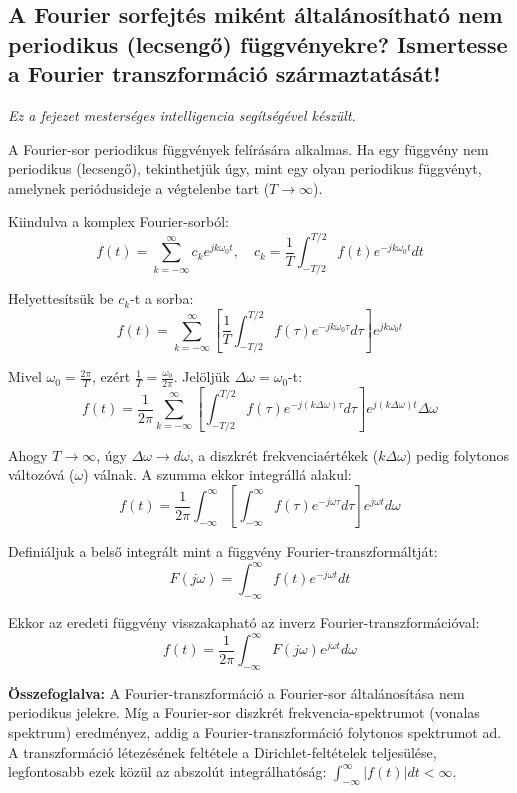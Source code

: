 \subsection{A Fourier sorfejtés miként általánosítható nem periodikus (lecsengő) függvényekre? Ismertesse a Fourier transzformáció származtatását!}

\noindent \textit{Ez a fejezet mesterséges intelligencia segítségével készült.}

A Fourier-sor periodikus függvények felírására alkalmas. Ha egy függvény nem periodikus (lecsengő), tekinthetjük úgy, mint egy olyan periodikus függvényt, amelynek periódusideje a végtelenbe tart ($T \to \infty$).

Kiindulva a komplex Fourier-sorból:
$$ f(t) = \sum_{k=-\infty}^{\infty} c_k e^{jk\omega_0 t}, \quad c_k = \frac{1}{T} \int_{-T/2}^{T/2} f(t) e^{-jk\omega_0 t} dt $$

Helyettesítsük be $c_k$-t a sorba:
$$ f(t) = \sum_{k=-\infty}^{\infty} \left[ \frac{1}{T} \int_{-T/2}^{T/2} f(\tau) e^{-jk\omega_0 \tau} d\tau \right] e^{jk\omega_0 t} $$

Mivel $\omega_0 = \frac{2\pi}{T}$, ezért $\frac{1}{T} = \frac{\omega_0}{2\pi}$. Jelöljük $\Delta\omega = \omega_0$-t:
$$ f(t) = \frac{1}{2\pi} \sum_{k=-\infty}^{\infty} \left[ \int_{-T/2}^{T/2} f(\tau) e^{-j(k\Delta\omega) \tau} d\tau \right] e^{j(k\Delta\omega) t} \Delta\omega $$

Ahogy $T \to \infty$, úgy $\Delta\omega \to d\omega$, a diszkrét frekvenciaértékek ($k\Delta\omega$) pedig folytonos változóvá ($\omega$) válnak. A szumma ekkor integrállá alakul:
$$ f(t) = \frac{1}{2\pi} \int_{-\infty}^{\infty} \left[ \int_{-\infty}^{\infty} f(\tau) e^{-j\omega \tau} d\tau \right] e^{j\omega t} d\omega $$

Definiáljuk a belső integrált mint a függvény Fourier-transzformáltját:
$$ F(j\omega) = \int_{-\infty}^{\infty} f(t) e^{-j\omega t} dt $$

Ekkor az eredeti függvény visszakapható az inverz Fourier-transzformációval:
$$ f(t) = \frac{1}{2\pi} \int_{-\infty}^{\infty} F(j\omega) e^{j\omega t} d\omega $$

\textbf{Összefoglalva:}
A Fourier-transzformáció a Fourier-sor általánosítása nem periodikus jelekre. Míg a Fourier-sor diszkrét frekvencia-spektrumot (vonalas spektrum) eredményez, addig a Fourier-transzformáció folytonos spektrumot ad. A transzformáció létezésének feltétele a Dirichlet-feltételek teljesülése, legfontosabb ezek közül az abszolút integrálhatóság: $\int_{-\infty}^{\infty} |f(t)| dt < \infty$.
